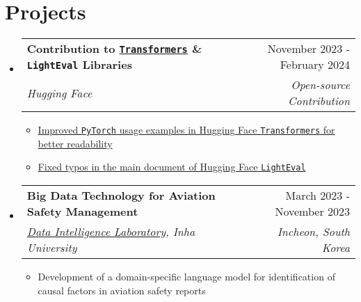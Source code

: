 \documentclass[letterpaper,11pt]{article}
\makeatletter
\newcommand{\resumeSubheading}[4]{
  \vspace{-1pt}\item
    \begin{tabular*}{0.97\textwidth}{l@{\extracolsep{\fill}}r}
      #1 & #2 \\
      \textit{\small#3} & \textit{\small #4} \\
    \end{tabular*}\vspace{-5pt}
}
\makeatother
\begin{document}
    \section{Projects}
    \begin{itemize}[leftmargin=*,label=]     

    
        \resumeSubheading
        {\textbf{Contribution to \texttt{\href{https://github.com/huggingface/transformers}{Transformers}} \& \texttt{LightEval} Libraries}}{November 2023 - February 2024}
            {Hugging Face}{Open-source Contribution}
            \begin{itemize}[label=\bullet]
                \item{\href{https://github.com/huggingface/transformers/pull/27184}{Improved \texttt{PyTorch} usage examples in Hugging Face \texttt{Transformers} for better readability}}

                \item{\href{https://github.com/huggingface/lighteval/pull/29}{Fixed typos in the main document of Hugging Face \texttt{LightEval}}}
            \end{itemize}
            
        \resumeSubheading
        {\textbf{Big Data Technology for Aviation Safety Management}}{March 2023 - November 2023}
            {\href{http://dilab.inha.ac.kr/}{Data Intelligence Laboratory}, Inha University}{Incheon, South Korea}
            \begin{itemize}[label=\bullet]
                \item{Development of a domain-specific language model for identification of causal factors in aviation safety reports}
            \end{itemize}



\end{itemize}
\end{document}
